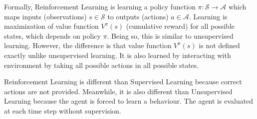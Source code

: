 Formally, Reinforcement Learning is learning a policy function 
$\pi \colon \mathcal{S} \rightarrow \mathcal{A}$ which maps 
inputs (observations) $s \in \mathcal{S}$ to outputs (actions) $a \in \mathcal{A}$. 
Learning is maximization of value function $V^{\pi}(s)$ (cumulative reward) for all possible states, which depends on policy $\pi$. 
Being so, this is similar to unsupervised learning. 
However, the difference is that value function $V^{\pi}(s)$ is not defined exactly unlike unsupervised learning. 
It is also learned by interacting with environment by taking all possible actions in all possible states. 

Reinforcement Learning is different than Supervised Learning because correct actions are not provided. 
Meanwhile, it is also different than Unsupervised Learning because the agent is forced to learn a behaviour. 
The agent is evaluated at each time step without supervision.